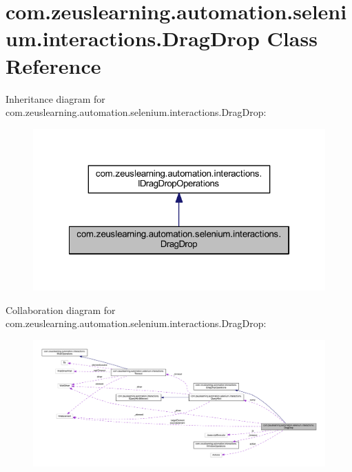 \hypertarget{classcom_1_1zeuslearning_1_1automation_1_1selenium_1_1interactions_1_1DragDrop}{}\section{com.\+zeuslearning.\+automation.\+selenium.\+interactions.\+Drag\+Drop Class Reference}
\label{classcom_1_1zeuslearning_1_1automation_1_1selenium_1_1interactions_1_1DragDrop}


Inheritance diagram for com.\+zeuslearning.\+automation.\+selenium.\+interactions.\+Drag\+Drop\+:\nopagebreak
\begin{figure}[H]
\begin{center}
\leavevmode
\includegraphics[width=322pt]{d8/d2b/classcom_1_1zeuslearning_1_1automation_1_1selenium_1_1interactions_1_1DragDrop__inherit__graph}
\end{center}
\end{figure}


Collaboration diagram for com.\+zeuslearning.\+automation.\+selenium.\+interactions.\+Drag\+Drop\+:
\nopagebreak
\begin{figure}[H]
\begin{center}
\leavevmode
\includegraphics[width=350pt]{d0/d93/classcom_1_1zeuslearning_1_1automation_1_1selenium_1_1interactions_1_1DragDrop__coll__graph}
\end{center}
\end{figure}
